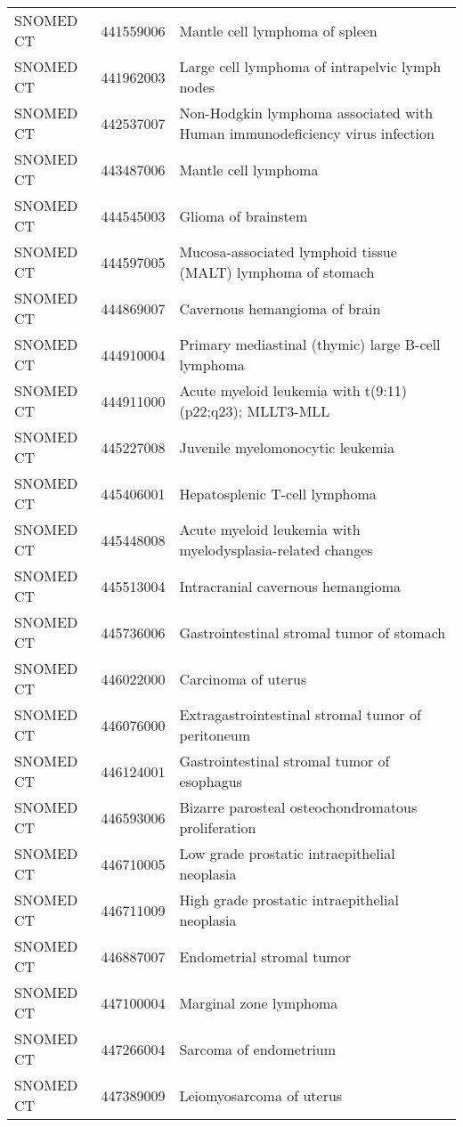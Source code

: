 \begin{longtable}{p{}p{}p{}}
  SNOMED CT & 441559006 & Mantle cell lymphoma of spleen \\ 
  SNOMED CT & 441962003 & Large cell lymphoma of intrapelvic lymph nodes \\ 
  SNOMED CT & 442537007 & Non-Hodgkin lymphoma associated with Human immunodeficiency virus infection \\ 
  SNOMED CT & 443487006 & Mantle cell lymphoma \\ 
  SNOMED CT & 444545003 & Glioma of brainstem \\ 
  SNOMED CT & 444597005 & Mucosa-associated lymphoid tissue (MALT) lymphoma of stomach \\ 
  SNOMED CT & 444869007 & Cavernous hemangioma of brain \\ 
  SNOMED CT & 444910004 & Primary mediastinal (thymic) large B-cell lymphoma \\ 
  SNOMED CT & 444911000 & Acute myeloid leukemia with t(9:11)(p22;q23); MLLT3-MLL \\ 
  SNOMED CT & 445227008 & Juvenile myelomonocytic leukemia \\ 
  SNOMED CT & 445406001 & Hepatosplenic T-cell lymphoma \\ 
  SNOMED CT & 445448008 & Acute myeloid leukemia with myelodysplasia-related changes \\ 
  SNOMED CT & 445513004 & Intracranial cavernous hemangioma \\ 
  SNOMED CT & 445736006 & Gastrointestinal stromal tumor of stomach \\ 
  SNOMED CT & 446022000 & Carcinoma of uterus \\ 
  SNOMED CT & 446076000 & Extragastrointestinal stromal tumor of peritoneum \\ 
  SNOMED CT & 446124001 & Gastrointestinal stromal tumor of esophagus \\ 
  SNOMED CT & 446593006 & Bizarre parosteal osteochondromatous proliferation \\ 
  SNOMED CT & 446710005 & Low grade prostatic intraepithelial neoplasia \\ 
  SNOMED CT & 446711009 & High grade prostatic intraepithelial neoplasia \\ 
  SNOMED CT & 446887007 & Endometrial stromal tumor \\ 
  SNOMED CT & 447100004 & Marginal zone lymphoma \\ 
  SNOMED CT & 447266004 & Sarcoma of endometrium \\ 
  SNOMED CT & 447389009 & Leiomyosarcoma of uterus \\ 

\end{longtable}
